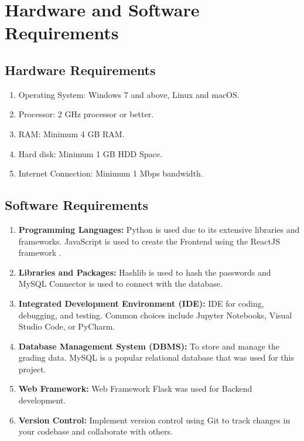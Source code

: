 \section{Hardware and Software Requirements}
\subsection{Hardware Requirements}
\begin{enumerate}
    \item Operating System: Windows 7 and above, Linux and macOS.
    \item Processor: 2 GHz processor or better.
    \item RAM: Minimum 4 GB RAM.
    \item Hard disk: Minimum 1 GB HDD Space.
    \item Internet Connection: Minimum 1 Mbps bandwidth.
\end{enumerate}    
\subsection{Software Requirements}
\begin{enumerate}
    \item \textbf{Programming Languages:} Python is used due to its extensive libraries and frameworks. JavaScript is used to create the Frontend using the ReactJS framework \cite{reactdocs}.

    \item \textbf{Libraries and Packages:} Hashlib is used to hash the passwords and MySQL Connector is used to connect with the database.
    
    \item \textbf{Integrated Development Environment (IDE):} IDE for coding, debugging, and testing. Common choices include Jupyter Notebooks, Visual Studio Code, or PyCharm.

    \item \textbf{Database Management System (DBMS):} To store and manage the grading data. MySQL is a popular relational database that was used for this project.
    
    \item \textbf{Web Framework:} Web Framework Flask \cite{flaskdocs} was used for Backend development.
    
    \item \textbf{Version Control:} Implement version control using Git to track changes in your codebase and collaborate with others.
\end{enumerate}
